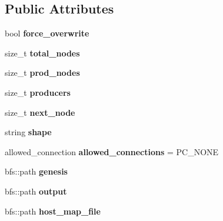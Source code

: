 \subsection*{Public Attributes}
\begin{DoxyCompactItemize}
\item 
\mbox{\label{structlauncher__def_a2f2bd48449ee1b6e029bd926c26c0af4}} 
bool {\bfseries force\+\_\+overwrite}
\item 
\mbox{\label{structlauncher__def_ac37e3cdbe9c52e16683c0051cf6e3860}} 
size\+\_\+t {\bfseries total\+\_\+nodes}
\item 
\mbox{\label{structlauncher__def_a756c5d66b063700e192663e7ab25e768}} 
size\+\_\+t {\bfseries prod\+\_\+nodes}
\item 
\mbox{\label{structlauncher__def_adef376a3bd9c59a20fc3e2bec3e6cf98}} 
size\+\_\+t {\bfseries producers}
\item 
\mbox{\label{structlauncher__def_a0760b0cb8c33e9056e3f45d4685971fb}} 
size\+\_\+t {\bfseries next\+\_\+node}
\item 
\mbox{\label{structlauncher__def_acee5315ece7d6df5c5ebd2439d210c93}} 
string {\bfseries shape}
\item 
\mbox{\label{structlauncher__def_ab953be9b54989d0ba574d4bd4e736dfc}} 
allowed\+\_\+connection {\bfseries allowed\+\_\+connections} = P\+C\+\_\+\+N\+O\+NE
\item 
\mbox{\label{structlauncher__def_a072eaad3508fab180d950a945cfcf3b6}} 
bfs\+::path {\bfseries genesis}
\item 
\mbox{\label{structlauncher__def_acd9a944cbdb5b0e0418419601e7b4973}} 
bfs\+::path {\bfseries output}
\item 
\mbox{\label{structlauncher__def_af546fce2bb184182d067839d79a58d03}} 
bfs\+::path {\bfseries host\+\_\+map\+\_\+file}
\item 
\mbox{\label{structlauncher__def_aa1dc3bdc23477e9f8d30cf11282d8540}} 

\end{DoxyCompactItemize}
